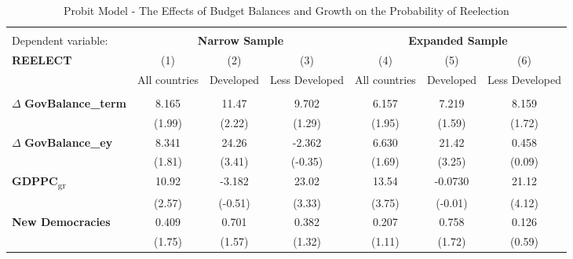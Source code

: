 \begin{table}
 \centering
 \caption{\small{Probit Model - The Effects of Budget Balances and Growth on the Probability of Reelection}}
 \label{table:probit}
\begin{adjustbox}{width=1\textwidth}
\begin{tabular}{l*{6}{c}}
\hline\hline \\[-0.5em]

Dependent variable: & \multicolumn{3}{c}{\textbf{Narrow Sample}} & \multicolumn{3}{c}{\textbf{Expanded Sample}} \\ 
		\cmidrule(l){2-4} \cmidrule(l){5-7} 
		
 \textbf{REELECT} &\multicolumn{1}{c}{(1)}&\multicolumn{1}{c}{(2)}&\multicolumn{1}{c}{(3)}&\multicolumn{1}{c}{(4)}&\multicolumn{1}{c}{(5)}&\multicolumn{1}{c}{(6)}\\
 &\multicolumn{1}{c}{All countries}&\multicolumn{1}{c}{Developed}&\multicolumn{1}{c}{Less Developed}&\multicolumn{1}{c}{All countries}&\multicolumn{1}{c}{Developed}&\multicolumn{1}{c}{Less Developed}\\
\hline
 & & & & & & \\
$\Delta$ \textbf{GovBalance\_term}  &       8.165\sym{**} &       11.47\sym{**} &       9.702         &       6.157\sym{*}  &       7.219         &       8.159\sym{*}  \\
            &      (1.99)         &      (2.22)         &      (1.29)         &      (1.95)         &      (1.59)         &      (1.72)         \\

$\Delta$ \textbf{GovBalance\_ey}      &       8.341\sym{*}  &       24.26\sym{***}&      -2.362         &       6.630\sym{*}  &       21.42\sym{***}&       0.458         \\
            &      (1.81)         &      (3.41)         &     (-0.35)         &      (1.69)         &      (3.25)         &      (0.09)         \\

\textbf{GDPPC}\textsubscript{gr}  &       10.92\sym{**} &      -3.182         &       23.02\sym{***}&  13.54\sym{***}&     -0.0730         &       21.12\sym{***}   \\
            &      (2.57)         &     (-0.51)         &      (3.33)         &      (3.75)         &     (-0.01)         &      (4.12)        \\

\textbf{New Democracies}       &       0.409\sym{*}  &       0.701         &       0.382         &       0.207         &       0.758\sym{*}  &       0.126         \\
            &      (1.75)         &      (1.57)         &      (1.32)         &      (1.11)         &      (1.72)         &      (0.59)         \\


\end{tabular}
\end{adjustbox}
\end{table}

